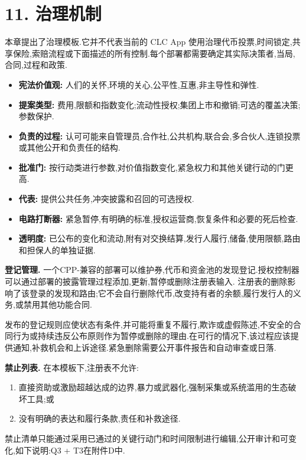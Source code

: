 \documentclass[11pt]{article}
\begin{document}
\section*{11. 治理机制}

本章提出了治理模板.它并不代表当前的 CLC App 使用治理代币投票,时间锁定,共享保险,索赔流程或下面描述的所有控制.每个部署都需要确定其实际决策者,当局,合同,过程和政策.

\begin{itemize}[leftmargin=*]
\item \textbf{宪法价值观:} 人们的关怀,环境的关心,公平性,互惠,非主导性和弹性.
\item \textbf{提案类型:} 费用,限额和指数变化;流动性授权;集团上市和撤销;可选的覆盖决策;参数保护.
\item \textbf{负责的过程:} 认可可能来自管理员,合作社,公共机构,联合会,多合伙人,连锁投票或其他公开和负责任的结构.
\item \textbf{批准门:} 按行动类进行参数,对价值指数变化,紧急权力和其他关键行动的门更高.
\item \textbf{代表:} 提供公共任务,冲突披露和召回的可选授权.
\item \textbf{电路打断器:} 紧急暂停,有明确的标准,授权运营商,恢复条件和必要的死后检查.
\item \textbf{透明度:} 已公布的变化和流动,附有对交换结算,发行人履行,储备,使用限额,路由和担保人的单独证据.
\end{itemize}
\textbf{登记管理.} 一个CPP-兼容的部署可以维护券,代币和资金池的发现登记.授权控制器可以通过部署的披露管理过程添加,更新,暂停或删除注册表输入. 注册表的删除影响了该登录的发现和路由;它不会自行删除代币,改变持有者的余额,履行发行人的义务,或禁用其他功能合同.

发布的登记规则应使状态有条件,并可能将重复不履行,欺诈或虚假陈述,不安全的合同行为或持续违反公布原则作为暂停或删除的理由.在可行的情况下,该过程应该提供通知,补救机会和上诉途径.紧急删除需要公开事件报告和自动审查或日落.

\textbf{禁止列表.} 在本模板下,注册表不允许:

\begin{enumerate}[leftmargin=*]
\item 直接资助或激励超越达成的边界,暴力或武器化,强制采集或系统滥用的生态破坏工具;或
\item 没有明确的表达和履行条款,责任和补救途径.
\end{enumerate}
禁止清单只能通过采用已通过的关键行动门和时间限制进行编辑,公开审计和可变化,如下说明:Q3 + T3在附件D中.
\end{document}
